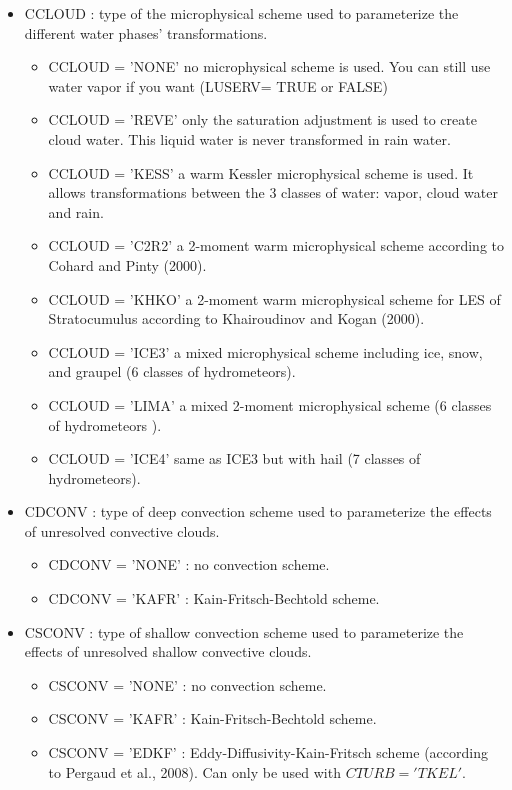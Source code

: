 \begin{itemize}
\item
{}
CCLOUD : type of the microphysical scheme used to parameterize the different 
water phases' transformations.
\begin{itemize}
\item
CCLOUD = 'NONE' no microphysical scheme is used. You can still use water vapor if
you want (LUSERV= TRUE or FALSE)
\item
CCLOUD = 'REVE' only the saturation adjustment is used to create
cloud water. This liquid water is never transformed 
in rain water. 
\item
CCLOUD = 'KESS' a warm Kessler microphysical scheme is used. It allows 
transformations between the  3 classes of water: vapor, cloud water and rain.
\item
CCLOUD = 'C2R2' a 2-moment warm microphysical scheme according to Cohard and Pinty (2000).
\item 
CCLOUD =  'KHKO' a 2-moment warm microphysical scheme for LES of Stratocumulus
according to Khairoudinov and Kogan (2000).
\item 
CCLOUD =  'ICE3' a mixed microphysical scheme including ice, 
snow, and graupel (6 classes of hydrometeors).
\item 
CCLOUD =  'LIMA' a mixed  2-moment microphysical scheme  (6 classes of hydrometeors ).
\item 
CCLOUD =  'ICE4' same as ICE3 but with hail (7 classes of hydrometeors).                     
\end{itemize}

\item
{}
CDCONV :  type of deep convection scheme used to parameterize
the effects of unresolved convective clouds.
\begin{itemize}
\item
CDCONV = 'NONE'  : no convection scheme.                            
\item
CDCONV = 'KAFR'  : Kain-Fritsch-Bechtold scheme.
\end{itemize}

\item
{}
CSCONV : type of shallow convection scheme used to parameterize
the effects of unresolved shallow convective clouds.
\begin{itemize}
\item
CSCONV = 'NONE'  : no convection scheme.                            
\item
CSCONV = 'KAFR'  : Kain-Fritsch-Bechtold scheme.
\item
CSCONV = 'EDKF'  : Eddy-Diffusivity-Kain-Fritsch scheme (according to Pergaud et al., 2008).
Can only be used with $CTURB='TKEL'$.
\end{itemize}


\end{itemize}
